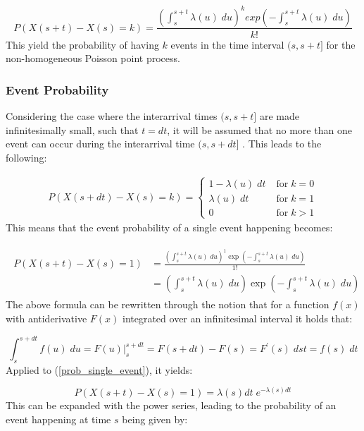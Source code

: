 \begin{equation}
    P(X(s+t) - X(s) = k) = \frac{\left(\int_s^{s+t} \lambda(u) \; du \right)^k exp\left(-\int_s^{s+t} \lambda(u) \; du\right)}{k!}
\end{equation}
This yield the probability of having $k$ events in the time interval $(s, s+t]$ for the non-homogeneous Poisson point process.
\clearpage
\subsubsection{Event Probability}
\label{sec:Method:Poisson:EventProbability}
Considering the case where the interarrival times $(s, s+t]$ are made infinitesimally small, such that $t = dt$, it will be assumed that no more than one event can occur during the interarrival time $(s, s+dt]$ \cite{Tommerup2021LearningNetworks}.
This leads to the following:

\begin{align}
P(X(s+dt) - X(s) = k) = 
\begin{cases}
    1 - \lambda(u) \; dt \; &\text{for} \; k=0 \\
    \lambda(u) \; dt \; &\text{for} \; k=1 \\
    0 \; &\text{for} \; k > 1
\end{cases}
\end{align}
This means that the event probability of a single event happening becomes:

\begin{align}
\begin{split}
    P(X(s+t) - X(s) = 1) 
    &= 
    \frac{\left(\int_s^{s+t} \lambda(u) \; du \right)^1 \exp \left(-\int_s^{s+t} \lambda(u) \; du\right)}{1!} \\
    &= 
    \left(\int_s^{s+t} \lambda(u) \; du \right) \exp \left(-\int_s^{s+t} \lambda(u) \; du\right)
\label{prob_single_event}
\end{split}
\end{align}
The above formula can be rewritten through the notion that for a function $f(x)$ with antiderivative $F(x)$ integrated over an infinitesimal interval it holds that:

\begin{equation}
    \int_s^{s+dt} f(u) \; du = F(u) \rvert_s^{s+dt} = F(s+dt) - F(s) = F^{\prime}(s) \; dst = f(s) \; dt
\end{equation}
Applied to (\ref{prob_single_event}), it yields:

\begin{equation}
    P(X(s+t) - X(s) = 1) = \lambda(s)dt \; e^{-\lambda(s)dt}
\end{equation}
This can be expanded with the power series, leading to the probability of an event happening at time $s$ being given by:

